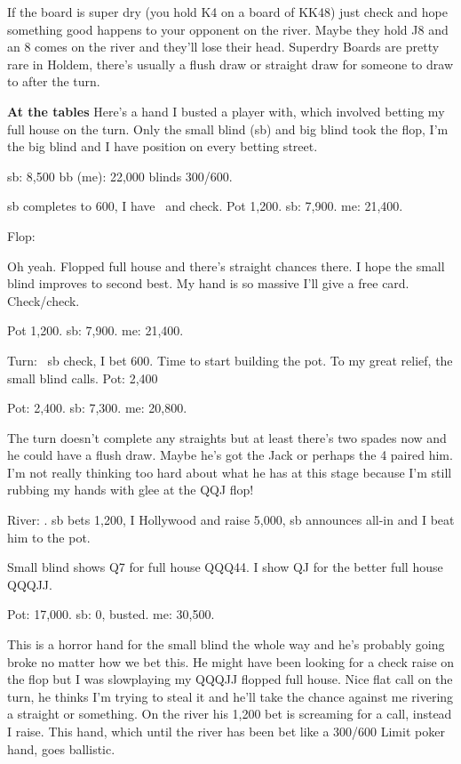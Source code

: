 If the board is super dry (you hold K4 on a board
of KK48) just check and hope something good happens
to your opponent on the river. Maybe they hold J8 and an 8 comes
on the river and they'll lose their head. Superdry Boards
are pretty rare in Holdem, there's usually a flush draw or straight draw
for someone to draw to after the turn.

\textbf{At the tables} Here's a hand I busted a player with, which
involved betting my full house on the turn. Only the small blind (sb)
and big blind took the flop, I'm the big blind and I have position
on every betting street.

sb: 8,500 bb (me): 22,000 blinds 300/600.

sb completes to 600, I have \Qc\Jh\ and check.
Pot 1,200. sb: 7,900. me: 21,400.

Flop: \Qs\Qh\Jd

Oh yeah. Flopped full house and there's straight chances there. I hope
the small blind improves to second best. My hand is so massive I'll give
a free card. Check/check.

Pot 1,200. sb: 7,900. me: 21,400.

Turn: \fours\ sb check, I bet 600. Time to start building the pot. To
my great relief, the small blind calls. Pot: 2,400

Pot: 2,400. sb: 7,300. me: 20,800.

The turn doesn't complete any straights but at least there's
two spades now and he could have a flush draw. Maybe he's
got the Jack or perhaps the 4 paired him. I'm not really thinking
too hard about what he has at this stage because I'm still rubbing my
hands with glee at the QQJ flop!

River: \fourc. sb bets 1,200, I Hollywood and raise 5,000, sb
announces all-in and I beat him to the pot.

Small blind shows Q7 for full house QQQ44. I show QJ for the better
full house QQQJJ.

Pot: 17,000. sb: 0, busted. me: 30,500.

This is a horror hand for the small blind the whole way and he's probably
going broke no matter how we bet this. He might have been looking for
a check raise on the flop but I was slowplaying my QQQJJ flopped full house.
Nice flat call on the turn, he thinks I'm trying to steal it and he'll take
the chance against me rivering a straight or something. On the river his
1,200 bet is screaming for a call, instead I raise. This hand, which until
the river has been bet like a 300/600 Limit poker hand, goes ballistic.

